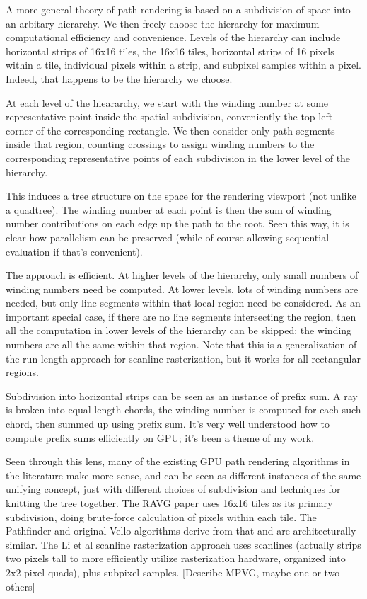 \documentclass[format=acmsmall]{acmart}
\begin{document}
A more general theory of path rendering is based on a subdivision of space into an arbitary hierarchy. We then freely choose the hierarchy for maximum computational efficiency and convenience. Levels of the hierarchy can include horizontal strips of 16x16 tiles, the 16x16 tiles, horizontal strips of 16 pixels within a tile, individual pixels within a strip, and subpixel samples within a pixel. Indeed, that happens to be the hierarchy we choose.

At each level of the hieararchy, we start with the winding number at some representative point inside the spatial subdivision, conveniently the top left corner of the corresponding rectangle. We then consider only path segments inside that region, counting crossings to assign winding numbers to the corresponding representative points of each subdivision in the lower level of the hierarchy.

This induces a tree structure on the space for the rendering viewport (not unlike a quadtree). The winding number at each point is then the sum of winding number contributions on each edge up the path to the root. Seen this way, it is clear how parallelism can be preserved (while of course allowing sequential evaluation if that's convenient).

The approach is efficient. At higher levels of the hierarchy, only small numbers of winding numbers need be computed. At lower levels, lots of winding numbers are needed, but only line segments within that local region need be considered. As an important special case, if there are no line segments intersecting the region, then all the computation in lower levels of the hierarchy can be skipped; the winding numbers are all the same within that region. Note that this is a generalization of the run length approach for scanline rasterization, but it works for all rectangular regions.

Subdivision into horizontal strips can be seen as an instance of prefix sum. A ray is broken into equal-length chords, the winding number is computed for each such chord, then summed up using prefix sum. It's very well understood how to compute prefix sums efficiently on GPU; it's been a theme of my work.

Seen through this lens, many of the existing GPU path rendering algorithms in the literature make more sense, and can be seen as different instances of the same unifying concept, just with different choices of subdivision and techniques for knitting the tree together. The RAVG paper uses 16x16 tiles as its primary subdivision, doing brute-force calculation of pixels within each tile. The Pathfinder and original Vello algorithms derive from that and are architecturally similar. The Li et al scanline rasterization approach uses scanlines (actually strips two pixels tall to more efficiently utilize rasterization hardware, organized into 2x2 pixel quads), plus subpixel samples. [Describe MPVG, maybe one or two others]
\end{document}
